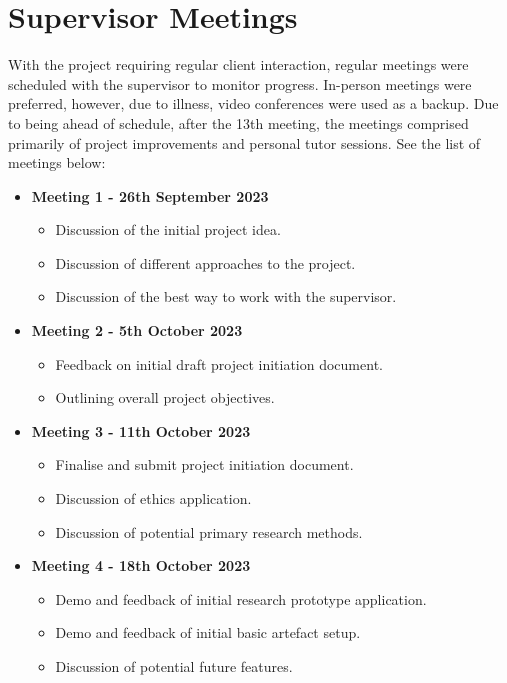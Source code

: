 \section{Supervisor Meetings}
\label{pm:supervisor_meetings}

With the project requiring regular client interaction, regular meetings were scheduled with the supervisor to monitor progress. In-person meetings were preferred, however, due to illness, video conferences were used as a backup. Due to being ahead of schedule, after the 13th meeting, the meetings comprised primarily of project improvements and personal tutor sessions. See the list of meetings below:

\begin{itemize}
    \item \textbf{Meeting 1 - 26th September 2023}
    \begin{itemize}
        \item Discussion of the initial project idea.
        \item Discussion of different approaches to the project.
        \item Discussion of the best way to work with the supervisor.
    \end{itemize}
    \item \textbf{Meeting 2 - 5th October 2023}
    \begin{itemize}
        \item Feedback on initial draft project initiation document.
        \item Outlining overall project objectives.
    \end{itemize}
    \item \textbf{Meeting 3 - 11th October 2023}
    \begin{itemize}
        \item Finalise and submit project initiation document.
        \item Discussion of ethics application.
        \item Discussion of potential primary research methods.
    \end{itemize}
    \item \textbf{Meeting 4 - 18th October 2023}
    \begin{itemize}
        \item Demo and feedback of initial research prototype application.
        \item Demo and feedback of initial basic artefact setup.
        \item Discussion of potential future features.

\end{itemize}
\end{itemize}
